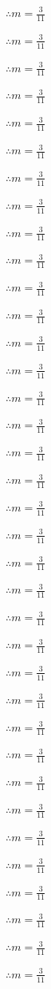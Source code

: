 \(\therefore m = \frac{3}{11}\)

\(\therefore m = \frac{3}{11}\)

\(\therefore m = \frac{3}{11}\)

\(\therefore m = \frac{3}{11}\)

\(\therefore m = \frac{3}{11}\)

\(\therefore m = \frac{3}{11}\)

\(\therefore m = \frac{3}{11}\)

\(\therefore m = \frac{3}{11}\)

\(\therefore m = \frac{3}{11}\)

\(\therefore m = \frac{3}{11}\)

\(\therefore m = \frac{3}{11}\)

\(\therefore m = \frac{3}{11}\)

\(\therefore m = \frac{3}{11}\)

\(\therefore m = \frac{3}{11}\)

\(\therefore m = \frac{3}{11}\)

\(\therefore m = \frac{3}{11}\)

\(\therefore m = \frac{3}{11}\)

\(\therefore m = \frac{3}{11}\)

\(\therefore m = \frac{3}{11}\)

\(\therefore m = \frac{3}{11}\)

\(\therefore m = \frac{3}{11}\)

\(\therefore m = \frac{3}{11}\)

\(\therefore m = \frac{3}{11}\)

\(\therefore m = \frac{3}{11}\)

\(\therefore m = \frac{3}{11}\)

\(\therefore m = \frac{3}{11}\)

\(\therefore m = \frac{3}{11}\)

\(\therefore m = \frac{3}{11}\)

\(\therefore m = \frac{3}{11}\)

\(\therefore m = \frac{3}{11}\)

\(\therefore m = \frac{3}{11}\)

\(\therefore m = \frac{3}{11}\)

\(\therefore m = \frac{3}{11}\)

\(\therefore m = \frac{3}{11}\)

\(\therefore m = \frac{3}{11}\)

\(\therefore m = \frac{3}{11}\)

